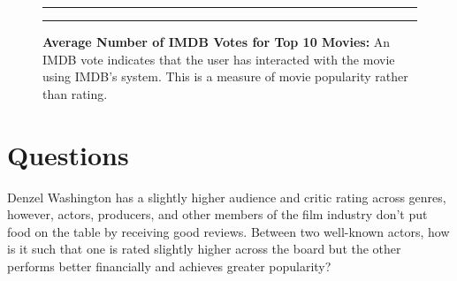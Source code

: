 \documentclass[]{article}
\begin{document}
\begin{figure}[!ht]
 \label{fig:one-graphic}
    \begin{center}
    \end{center}
    \hrule
      \vspace{2mm}
    \caption{ \textbf{Average Number of IMDB Votes for Top 10 Movies:} \newline \footnotesize{ An IMDB
    vote indicates that the user has interacted with the movie using IMDB's system. This is a measure
    of movie popularity rather than rating.}  }
    \vspace{2mm}
    \hrule
\end{figure}

\section{Questions}
\label{sec:questions}

\doublespacing

Denzel Washington has a slightly higher audience and critic rating
across genres, however, actors, producers, and other members of the film
industry don't put food on the table by receiving good reviews. Between
two well-known actors, how is it such that one is rated slightly higher
across the board but the other performs better financially and achieves
greater popularity? \newline
\end{document}
